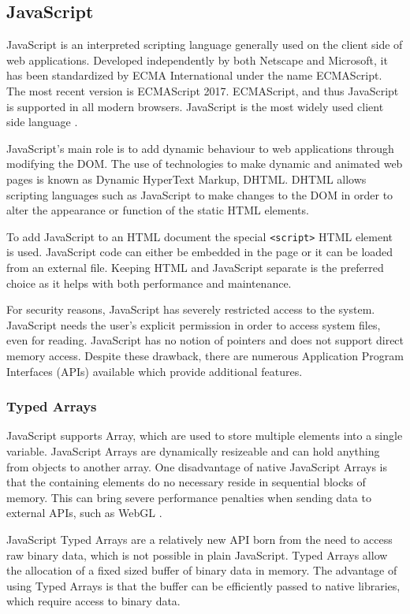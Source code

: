 \documentclass[10pt,a4paper,twoside]{book}
\begin{document}
\subsection{JavaScript}
\label{javascript}
JavaScript is an interpreted scripting language generally used on the client side of web applications. Developed independently by both Netscape and Microsoft, it has been standardized by ECMA International under the name ECMAScript. The most recent version is ECMAScript 2017. ECMAScript, and thus JavaScript is supported in all modern browsers. JavaScript is the most widely used client side language \cite{javascriptstats, javascriptabout}.

JavaScript's main role is to add dynamic behaviour to web applications through modifying the DOM. The use of technologies to make dynamic and animated web pages is known as Dynamic HyperText Markup, DHTML. DHTML allows scripting languages such as JavaScript to make changes to the DOM in order to alter the appearance or function of the static HTML elements.

To add JavaScript to an HTML document the special \texttt{<script>} HTML element is used. JavaScript code can either be embedded in the page or it can be loaded from an external file. Keeping HTML and JavaScript separate is the preferred choice as it helps with both performance and maintenance.

For security reasons, JavaScript has severely restricted access to the system. JavaScript needs the user's explicit permission in order to access system files, even for reading. JavaScript has no notion of pointers and does not support direct memory access. Despite these drawback, there are numerous Application Program Interfaces (APIs) available which provide additional features.

\subsubsection{Typed Arrays}
\label{typedarray}

JavaScript supports Array, which are used to store multiple elements into a single variable. JavaScript Arrays are dynamically resizeable and can hold anything from objects to another array. One disadvantage of native JavaScript Arrays is that the containing elements do no necessary reside in sequential blocks of memory. This can bring severe performance penalties when sending data to external APIs, such as WebGL \cite{webgl}.

JavaScript Typed Arrays \cite{typedarrays} are a relatively new API born from the need to access raw binary data, which is not possible in plain JavaScript. Typed Arrays allow the allocation of a fixed sized buffer of binary data in memory. The advantage of using Typed Arrays is that the buffer can be efficiently passed to native libraries, which require access to binary data.
\end{document}
